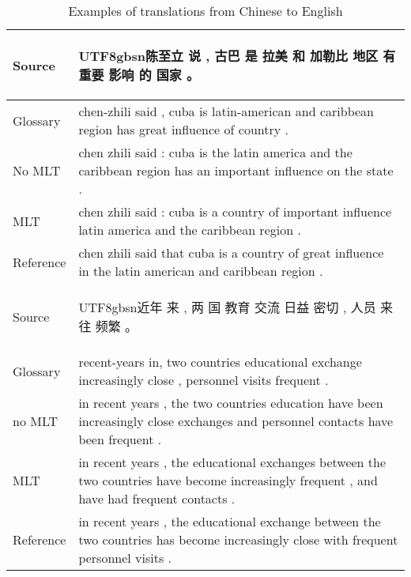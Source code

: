 \documentclass[a4paper]{article}
\newcommand{\cntext}[1]{\begin{CJK}{UTF8}{gbsn}#1\end{CJK}}
\begin{document}
\begin{table*}
\centering
\begin{tabular}{|l|m{}|} \hline
Source & \cntext{陈至立 说 , 古巴 是 拉美 和 加勒比 地区 有 重要 影响 的 国家 。}
\\ \hline
Glossary & chen-zhili said , cuba is latin-american and caribbean region has great influence of country .
\\ \hline
No MLT & chen zhili said : cuba is the latin america and the caribbean region has an important influence on the state .
\\ \hline
MLT & chen zhili said : cuba is a country of important influence latin america and the caribbean region .
\\ \hline
Reference & chen zhili said that cuba is a country of great influence in the latin american and caribbean region .
\\ \hline \hline

Source & \cntext{近年 来 , 两 国 教育 交流 日益 密切 , 人员 来往 频繁 。}
\\ \hline
Glossary & recent-years in, two countries educational exchange increasingly close , personnel visits frequent .
\\ \hline
no MLT & in recent years , the two countries education have been increasingly close exchanges and personnel contacts have been frequent .
\\ \hline
MLT & in recent years , the educational exchanges between the two countries have become increasingly frequent , and have had frequent contacts .
\\ \hline
Reference & in recent years , the educational exchange between the two countries has become increasingly close with frequent personnel visits .
\\ \hline
\end{tabular}
\caption{Examples of translations from Chinese to English}
\label{t1}
\end{table*}
\end{document}
